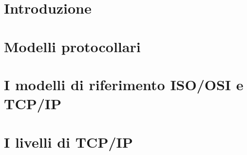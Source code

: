 \documentclass[12 pt]{article}
\begin{document}
\newgeometry{}

\tableofcontents
\restoregeometry

\section{Introduzione}


\section{Modelli protocollari}


\section{I modelli di riferimento ISO/OSI e TCP/IP}


\section{I livelli di TCP/IP}

\end{document}

